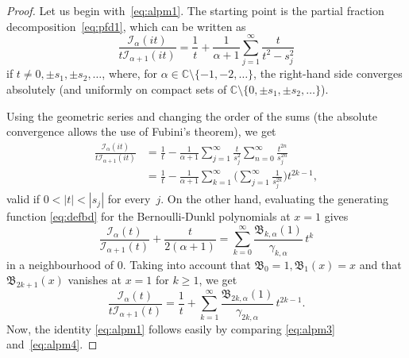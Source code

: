 \documentclass[10pt,a4paper]{article}
\theoremstyle{plain}
\theoremstyle{definition}
\numberwithin{equation}{section} %
\newcommand{\I}{\mathcal{I}}
\newcommand{\B}{\mathfrak{B}}
\newcommand{\CC}{\mathbb{C}}
\newcommand{\cc}{\gamma}
\begin{document}
\begin{proof}
Let us begin with~\eqref{eq:alpm1}. The starting point is the partial fraction decomposition~\eqref{eq:pfd1}, which can be written as
\begin{equation*}
  \frac{\I_\alpha (it)}{t\I_{\alpha+1}(it)} = \frac{1}{t}
  + \frac{1}{\alpha+1} \sum_{j=1}^\infty \frac{t}{t^2-s_j^2}
\end{equation*}
if $t \not= 0, \pm s_1,\pm s_2,\dots$, where, for $\alpha\in \CC\setminus\{-1,-2,\dots \}$, the right-hand side
converges absolutely (and uniformly on compact sets of $\CC\setminus\{0, \pm s_1,\pm s_2,\dots \}$).

Using the geometric series and changing the order of the sums (the absolute convergence allows the use of Fubini's theorem), we get
\begin{align}
\nonumber
  \frac{\I_\alpha (it)}{t\I_{\alpha+1}(it)}
  &= \frac{1}{t} -
  \frac{1}{\alpha+1}
  \sum_{j=1}^\infty \frac{t}{s_j^2} \sum_{n=0}^\infty \frac{t^{2n}}{s_j^{2n}}
  \\
\label{eq:alpm3}
  &= \frac{1}{t} -
  \frac{1}{\alpha+1}
  \sum_{k=1}^\infty \Big(\sum_{j=1}^\infty \frac{1}{s_j^{2k}} \Big)  t^{2k-1},
\end{align}
valid if $0 < |t| < |s_j|$ for every~$j$.
On the other hand, evaluating the generating function \eqref{eq:defbd} for the Bernoulli-Dunkl polynomials at $x=1$ gives
\[
  \frac{\I_\alpha (t)}{\I_{\alpha+1}(t)} + \frac{t}{2(\alpha+1)}
  = \sum_{k=0}^\infty \frac{\B_{k,\alpha}(1)}{\cc_{k,\alpha}} \,t^k
\]
in a neighbourhood of $0$.
Taking into account that $\B_0=1, \B_1(x)=x$ and that $\B_{2k+1}(x)$ vanishes at $x=1$ for $k\ge 1$, we get
\begin{equation}
\label{eq:alpm4}
  \frac{\I_\alpha (t)}{t\I_{\alpha+1}(t)}
  = \frac{1}{t} + \sum_{k=1}^\infty \frac{\B_{2k,\alpha}(1)}{\cc_{2k,\alpha}} \,t^{2k-1}.
\end{equation}
Now, the identity \eqref{eq:alpm1} follows easily by comparing \eqref{eq:alpm3} and~\eqref{eq:alpm4}.


\end{proof}
\end{document}
